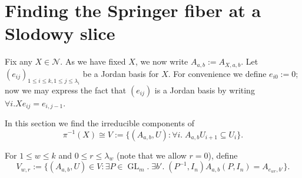 \documentclass[12pt,psamsfonts]{article}
\DeclareMathOperator{\GL}{GL}
\begin{document}
\section{Finding the Springer fiber at a Slodowy slice}
\par Fix any \(X \in \mathcal{N}\).
As we have fixed \(X\), we now write \(A_{a, b} := A_{X, a, b}\).
Let \((e_{ij})_{1 \leq i \leq k, 1 \leq j \leq \lambda_i}\) be a Jordan basis for \(X\).
For convenience we define \(e_{i0} := 0\); now we may express the fact that \((e_{ij})\) is a Jordan basis by writing \(\forall i. Xe_{ij} = e_{i,j - 1}\).
\par In this section we find the irreducible components of
\[\pi^{-1}(X) \cong V := \{(A_{a, b}, U) : \forall i. \; A_{a, b} U_{i + 1} \subseteq U_i\}.\]
\par For \(1 \leq w \leq k\) and \(0 \leq r \leq \lambda_w\) (note that we allow \(r = 0\)), define 
\[V_{w,r} := \{(A_{a, b}, U) \in V : \exists P \in \GL_{m}. \; \exists b'. \; (P^{-1}, I_n) A_{a, b} (P, I_n) = A_{e_{wr}, b'} \}.\]
\end{document}
